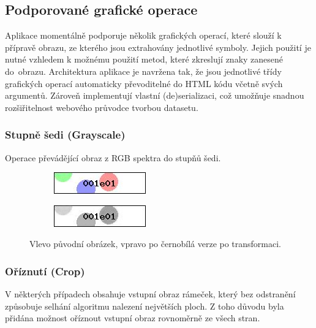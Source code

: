 \documentclass[
  field=ainfp,
  master=true,
  biblatex,
  sourcecodes=false,
  theorems=false,
  glossaries,
  index
]{kidiplom}
\begin{document}
\subsection{Podporované grafické operace}
Aplikace momentálně podporuje několik grafických operací, které slouží k pří\-pravě obrazu, ze kterého jsou extrahovány jednotlivé symboly. Jejich použití je nutné vzhledem k možnému použití metod, které zkreslují znaky zanesené do~obrazu. Architektura aplikace je navržena tak, že jsou jednotlivé třídy grafic\-kých operací automaticky převoditelné do HTML kódu včetně svých argumentů. Zároveň implementují vlastní (de)se\-riali\-zaci, což umožňuje snadnou rozšiřitelnost webového průvodce tvorbou data\-setu.
\subsubsection*{Stupně šedi (Grayscale)}
Operace převádějící obraz z RGB spektra do stupňů šedi.
\begin{figure}[H]
\centering
\begin{subfigure}{.5\textwidth}
  \centering
  \includegraphics[width=.8\linewidth]{images/grayscale_original.jpg}
\end{subfigure}%
\begin{subfigure}{.5\textwidth}
  \centering
  \includegraphics[width=.8\linewidth]{images/grayscale_result.png}
\end{subfigure}
\caption{Vlevo původní obrázek, vpravo po černobílá verze po transformaci.}
\label{fig:crop_example}
\end{figure}

\subsubsection*{Oříznutí (Crop)}
V některých případech obsahuje vstupní obraz rámeček, který bez odstranění způsobuje selhání algoritmu nalezení největších ploch. Z toho důvodu byla při\-dána možnost oříznout vstupní obraz rovnoměrně ze všech stran.
\end{document}
